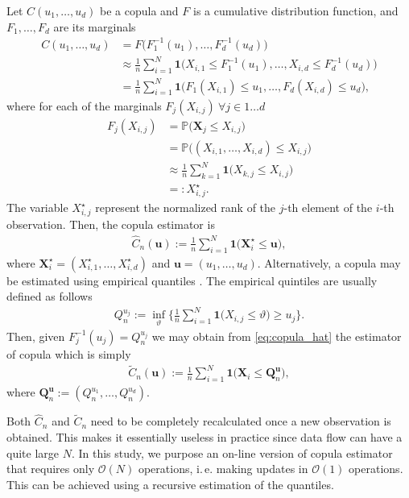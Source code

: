 \documentclass[12pt]{article}
\begin{document}
	Let $ C(u_1, \dots, u_d) $ be a copula and $ F $ is a cumulative distribution function, and $ F_1, \dots, F_d $ are its marginals
	\begin{align}
		C(u_1, \dots, u_d) &= F\big(F^{-1}_1(u_1), \dots, F^{-1}_d(u_d)\big) \\
		&\approx \frac{1}{n} \sum_{i=1}^{N} \mathbf{1}\big(X_{i, 1} \leq F_1^{-1}(u_1), \dots, X_{i, d} \leq F_d^{-1}(u_d)\big) \label{eq:copula_hat} \\
		&= \frac{1}{n} \sum_{i=1}^{N} \mathbf{1}\big(F_1(X_{i, 1}) \leq u_1, \dots, F_d(X_{i, d}) \leq u_d\big), 
	\end{align}
	where for each of the marginals $ F_j(X_{i, j}) ~ \forall j\in1\dots d $
	\begin{align}
		F_j(X_{i, j}) &= \mathbb{P}\big(\mathbf{X}_j \leq X_{i, j}\big)  \\
		&= \mathbb{P}\big((X_{i, 1}, \dots, X_{i, d}) \leq X_{i, j}\big) \\
		&\approx \frac{1}{n} \sum_{k=1}^{N} \mathbf{1}\big(X_{k, j} \leq X_{i, j}\big) \\
		&=: X^\star_{i, j}.
	\end{align}
	The variable $ X^\star_{i, j} $ represent the normalized rank of the $ j $-th element of the $ i $-th observation. Then, the copula estimator is
	\begin{align}
		\widehat{C}_n(\mathbf{u}) := \frac{1}{n}\sum_{i=1}^{N} \mathbf{1}\big(\mathbf{X}^\star_i \leq \mathbf{u}\big), 
	\end{align}
	where $ \mathbf{X}^\star_i = (X^\star_{i, 1}, \dots, X^\star_{i, d}) $ and $ \mathbf{u} = (u_1, \dots, u_d) $. Alternatively, a copula may be estimated using empirical quantiles \parencite{Deheuvels1979}. The empirical quintiles are usually defined as follows
	\begin{align}
	Q^{u_j}_n := \inf_\vartheta \Bigg\{ \frac{1}{n} \sum_{i=1}^{N} \mathbf{1}\big(X_{i, j} \leq \vartheta \big) \geq u_j \Bigg\}.
	\end{align}
	Then, given $ F_j^{-1}(u_j) = Q^{u_j}_n $ we may obtain from \eqref{eq:copula_hat} the estimator of copula which is simply
	\begin{align}
	\widetilde{C}_n (\mathbf{u}) := \frac{1}{n}\sum_{i=1}^{N} \mathbf{1}\big(\mathbf{X}_i \leq \mathbf{Q}^{\mathbf{u}}_n\big), 
	\end{align}
	where $ \mathbf{Q}^{\mathbf{u}}_n := (Q^{u_1}_n, \dots, Q^{u_d}_n) $.
		
	Both $ \widehat{C}_n $ and $ \widetilde{C}_n $ need to be completely recalculated once a new observation is obtained. This makes it essentially useless in practice since data flow can have a quite large $ N $. In this study, we purpose an on-line version of copula estimator that requires only $ \mathcal{O}(N) $ operations, i.\,e. making updates in $ \mathcal{O}(1) $ operations. This can be achieved using a recursive estimation of the quantiles.
	
\end{document}
